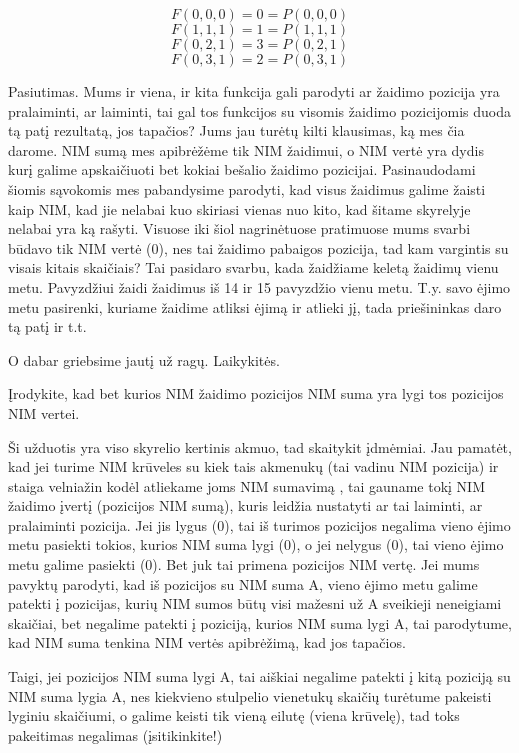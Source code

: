 $$F(0,0,0)=0=P(0,0,0)$$
$$F(1,1,1)=1=P(1,1,1)$$
$$F(0,2,1)=3=P(0,2,1)$$
$$F(0,3,1)=2=P(0,3,1)$$

Pasiutimas. Mums ir viena, ir kita funkcija gali parodyti ar žaidimo pozicija
yra pralaiminti, ar laiminti, tai gal tos funkcijos su visomis žaidimo
pozicijomis duoda tą patį rezultatą, jos tapačios? Jums jau turėtų kilti
klausimas, ką mes čia darome. NIM sumą mes apibrėžėme tik NIM žaidimui, o NIM
vertė yra dydis kurį galime apskaičiuoti bet kokiai bešalio žaidimo pozicijai.
Pasinaudodami šiomis sąvokomis mes pabandysime parodyti, kad visus žaidimus
galime žaisti kaip NIM, kad jie nelabai kuo skiriasi vienas nuo kito, kad
šitame skyrelyje nelabai yra ką rašyti. Visuose iki šiol nagrinėtuose
pratimuose mums svarbi būdavo tik NIM vertė (0), nes tai žaidimo pabaigos
pozicija, tad kam vargintis su visais kitais skaičiais? Tai pasidaro svarbu,
kada žaidžiame keletą žaidimų vienu metu. Pavyzdžiui žaidi žaidimus iš 14 ir 15
pavyzdžio vienu metu. T.y. savo ėjimo metu pasirenki, kuriame žaidime atliksi
ėjimą ir atlieki jį, tada priešininkas daro tą  patį ir t.t.

O dabar griebsime jautį už ragų. Laikykitės.

\begin{pavnr} 
  Įrodykite, kad bet kurios NIM žaidimo pozicijos NIM suma yra lygi tos
  pozicijos NIM vertei.
\end{pavnr}

Ši užduotis yra viso skyrelio kertinis akmuo, tad skaitykit įdmėmiai. Jau
pamatėt, kad jei turime NIM krūveles su kiek tais akmenukų (tai vadinu NIM
pozicija) ir staiga velniažin kodėl atliekame joms NIM sumavimą , tai gauname
tokį NIM žaidimo įvertį (pozicijos NIM sumą), kuris leidžia nustatyti ar tai
laiminti, ar pralaiminti pozicija. Jei jis lygus (0), tai iš turimos pozicijos
negalima vieno ėjimo metu pasiekti tokios, kurios NIM suma lygi (0), o jei
nelygus (0), tai vieno ėjimo metu galime pasiekti (0). Bet juk tai primena
pozicijos NIM vertę. Jei mums pavyktų parodyti, kad iš pozicijos su NIM suma A,
vieno ėjimo metu galime patekti į pozicijas, kurių NIM sumos būtų visi mažesni
už A sveikieji neneigiami skaičiai, bet negalime patekti į poziciją, kurios NIM
suma lygi A, tai parodytume, kad NIM suma tenkina NIM vertės apibrėžimą, kad
jos tapačios.

Taigi, jei pozicijos NIM suma lygi A, tai aiškiai negalime patekti į kitą
poziciją su NIM suma lygia A, nes kiekvieno stulpelio vienetukų skaičių
turėtume pakeisti lyginiu skaičiumi, o galime keisti tik vieną eilutę (viena
krūvelę), tad toks pakeitimas negalimas (įsitikinkite!)

